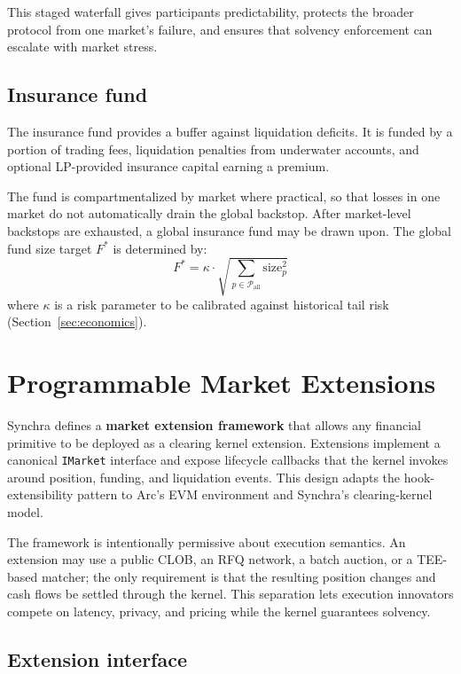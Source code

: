 \documentclass[11pt,a4paper]{article}
\begin{document}
This staged waterfall gives participants predictability, protects the broader protocol from one market's failure, and ensures that solvency enforcement can escalate with market stress.

\subsection{Insurance fund}

The insurance fund provides a buffer against liquidation deficits. It is funded by a portion of trading fees, liquidation penalties from underwater accounts, and optional LP-provided insurance capital earning a premium.

The fund is compartmentalized by market where practical, so that losses in one market do not automatically drain the global backstop. After market-level backstops are exhausted, a global insurance fund may be drawn upon. The global fund size target $F^*$ is determined by:
\[
F^* = \kappa \cdot \sqrt{\sum_{p \in \mathcal{P}_{\text{all}}} \text{size}_p^2}
\]
where $\kappa$ is a risk parameter to be calibrated against historical tail risk (Section~\ref{sec:economics}).

\section{Programmable Market Extensions}
\label{sec:markets}

Synchra defines a \textbf{market extension framework} that allows any financial primitive to be deployed as a clearing kernel extension. Extensions implement a canonical \texttt{IMarket} interface and expose lifecycle callbacks that the kernel invokes around position, funding, and liquidation events. This design adapts the hook-extensibility pattern to Arc's EVM environment and Synchra's clearing-kernel model.

The framework is intentionally permissive about execution semantics. An extension may use a public CLOB, an RFQ network, a batch auction, or a TEE-based matcher; the only requirement is that the resulting position changes and cash flows be settled through the kernel. This separation lets execution innovators compete on latency, privacy, and pricing while the kernel guarantees solvency.

\subsection{Extension interface}
\end{document}
